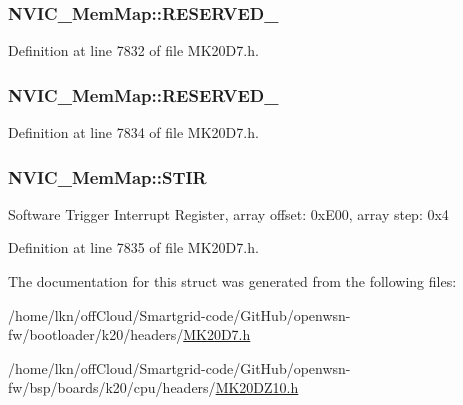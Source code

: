 \subsubsection[{\texorpdfstring{R\+E\+S\+E\+R\+V\+E\+D\+\_\+4}{RESERVED_4}}]{ N\+V\+I\+C\+\_\+\+Mem\+Map\+::\+R\+E\+S\+E\+R\+V\+E\+D\+\_}\hypertarget{struct_n_v_i_c___mem_map_ae257851689c6513dec25b0a236a36956}{}\label{struct_n_v_i_c___mem_map_ae257851689c6513dec25b0a236a36956}


Definition at line 7832 of file M\+K20\+D7.\+h.

\subsubsection[{\texorpdfstring{R\+E\+S\+E\+R\+V\+E\+D\+\_\+5}{RESERVED_5}}]{ N\+V\+I\+C\+\_\+\+Mem\+Map\+::\+R\+E\+S\+E\+R\+V\+E\+D\+\_}\hypertarget{struct_n_v_i_c___mem_map_acd83ec9417bf8a918af0dbe4c543720b}{}\label{struct_n_v_i_c___mem_map_acd83ec9417bf8a918af0dbe4c543720b}


Definition at line 7834 of file M\+K20\+D7.\+h.

\subsubsection[{\texorpdfstring{S\+T\+IR}{STIR}}]{ N\+V\+I\+C\+\_\+\+Mem\+Map\+::\+S\+T\+IR}\hypertarget{struct_n_v_i_c___mem_map_a0d427d2c9851d4fb15dbee6fe4b35e60}{}\label{struct_n_v_i_c___mem_map_a0d427d2c9851d4fb15dbee6fe4b35e60}
Software Trigger Interrupt Register, array offset\+: 0x\+E00, array step\+: 0x4 

Definition at line 7835 of file M\+K20\+D7.\+h.



The documentation for this struct was generated from the following files\+:\begin{DoxyCompactItemize}
\item 
/home/lkn/off\+Cloud/\+Smartgrid-\/code/\+Git\+Hub/openwsn-\/fw/bootloader/k20/headers/\hyperlink{bootloader_2k20_2headers_2_m_k20_d7_8h}{M\+K20\+D7.\+h}\item 
/home/lkn/off\+Cloud/\+Smartgrid-\/code/\+Git\+Hub/openwsn-\/fw/bsp/boards/k20/cpu/headers/\hyperlink{_m_k20_d_z10_8h}{M\+K20\+D\+Z10.\+h}\end{DoxyCompactItemize}
